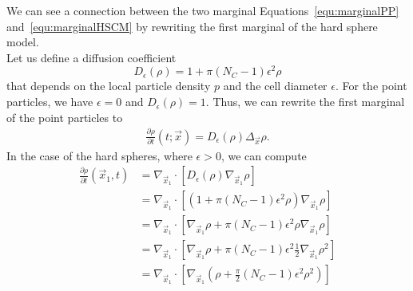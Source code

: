 We can see a connection between the two marginal Equations~\eqref{equ:marginalPP} and~\eqref{equ:marginalHSCM} by rewriting the first marginal of the hard sphere model. \\
Let us define a diffusion coefficient 
\[
    D_{\epsilon}(\rho) = 1 + \pi(N_{C}-1)\epsilon^2 \rho 
\]
that depends on the local particle density $p$ and the cell diameter $\epsilon$. 
For the point particles, we have $\epsilon = 0$ and $D_{\epsilon}(\rho) = 1$.
Thus, we can rewrite the first marginal of the point particles to  
\begin{align*}
    \frac{\partial \rho}{\partial t}(t; \vec{x}) = D_{\epsilon}(\rho) \Delta_{\vec{x}} \rho. 
\end{align*}
In the case of the hard spheres, where $\epsilon > 0$, we can compute
\begin{align*}
    \frac{\partial \rho}{\partial t}(\vec{x}_1, t) &= \nabla_{\vec{x}_1} \cdot [D_{\epsilon}(\rho) \nabla_{\vec{x}_1} \rho] \\  
    &= \nabla_{\vec{x}_1} \cdot [(1 + \pi(N_{C}-1)\epsilon^2 \rho) \nabla_{\vec{x}_1} \rho] \\
    &= \nabla_{\vec{x}_1} \cdot [\nabla_{\vec{x}_1} \rho + \pi(N_{C}-1)\epsilon^2 \rho \nabla_{\vec{x}_1} \rho] \\
    &= \nabla_{\vec{x}_1} \cdot [\nabla_{\vec{x}_1} \rho + \pi(N_{C}-1)\epsilon^2 \frac{1}{2}\nabla_{\vec{x}_1} \rho^2] \\
    &= \nabla_{\vec{x}_1} \cdot [\nabla_{\vec{x}_1} (\rho + \frac{\pi}{2}(N_{C}-1)\epsilon^2 \rho^2)] \\
\end{align*}


